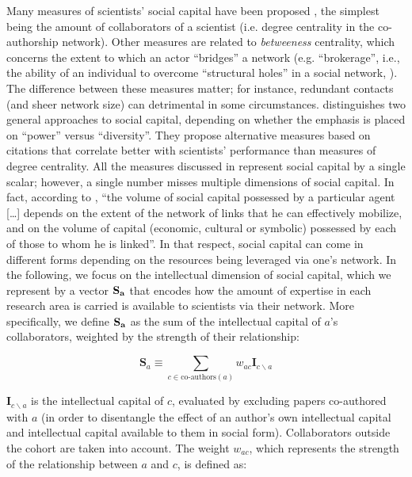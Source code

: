 \documentclass{article}
\begin{document}
Many measures of scientists' social capital have been proposed \citep{Abbasi2014,Schirone2023}, the simplest being the amount of collaborators of a scientist (i.e. degree centrality in the co-authorship network). Other measures are related to \textit{betweeness} centrality, which concerns the extent to which an actor ``bridges'' a network (e.g. ``brokerage'', i.e., the ability of an individual to overcome ``structural holes'' in a social network, \citealt{BurtBrokerage2007}). The difference between these measures matter; for instance, redundant contacts (and sheer network size) can detrimental in some circumstances. \citet{Abbasi2014} distinguishes two general approaches to social capital, depending on whether the emphasis is placed on ``power'' versus ``diversity''. They propose alternative measures based on citations that correlate better with scientists' performance than measures of degree centrality. All the measures discussed in \citealt{Abbasi2014} represent social capital by a single scalar; however, a single number misses multiple dimensions of social capital. In fact, according to \citet{Bourdieu1980}, ``the volume of social capital possessed by a particular agent [\dots] depends on the extent of the network of links that he can effectively mobilize, and on the volume of capital (economic, cultural or symbolic) possessed by each of those to whom he is linked''. In that respect, social capital can come in different forms depending on the resources being leveraged via one's network. %
In the following, we focus on the intellectual dimension of social capital, which we represent by a vector $\bf{S}_{a}$ that encodes how the amount of expertise in each research area is carried is available to scientists via their network. %
More specifically, we define $\bf{S}_{a}$ as the sum of the intellectual capital of $a$'s collaborators, weighted by the strength of their relationship:

\begin{equation}
    \bm{S}_{a} \equiv \sum_{c \in \text{co-authors}(a)} w_{ac} \bm{I}_{c\backslash a}
\end{equation}

$\bm{I}_{c\backslash a}$ is the intellectual capital of $c$, evaluated by excluding papers co-authored with $a$ (in order to disentangle the effect of an author's own intellectual capital and intellectual capital available to them in social form). Collaborators outside the cohort are taken into account. The weight $w_{ac}$, which represents the strength of the relationship between $a$ and $c$, is defined as:
\end{document}
